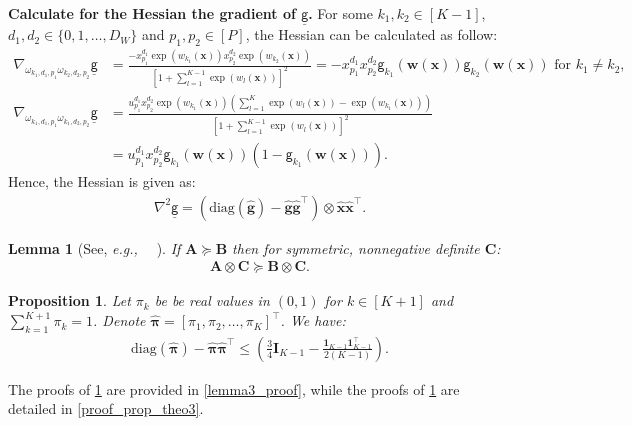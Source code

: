 \documentclass{article}
\def\eg{{\em e.g.,~}}
\newcommand{\nn}{\nonumber} %
\def\pib         {{\sbmm{\pi}}\XS}                 \def\Pib        {{\sbmm{\Pi}}\XS}
\def\XS{\xspace}
\def\sbmm#1{\ensuremath{\boldsymbol{#1}}}
\newtheorem{lemma}{Lemma}
\newtheorem{proposition}{Proposition}
\def\sfg{\mathsf{g}}
\def\evomega{\omega}
\def\vg{{\bm{g}}}
\def\vw{{\bm{w}}}
\def\vx{{\bm{x}}}
\def\evomega{{\omega}}
\def\evu{{u}}
\def\evx{{x}}
\def\mA{{\bm{A}}}
\def\mB{{\bm{B}}}
\def\mC{{\bm{C}}}
\def\mI{{\bm{I}}}
\begin{document}
{\bf Calculate for the Hessian the gradient of $\underline{\sfg}$.} For some $k_1, k_2 \in [K-1]$, $d_1,d_2 \in \{0,1,\dots,D_W\}$ and $p_1, p_2\in [P]$, the Hessian can be calculated as follow:
\begin{align*}
    \nabla_{\evomega_{k_1,d_1,p_1}\evomega_{k_2,d_2,p_2}}\underline{\sfg}&=\frac{-\evx^{d_1}_{p_1}\exp(w_{k_1}(\vx))\evx^{d_2}_{p_2}\exp(w_{k_2}(\vx))}{\left[1+\displaystyle\sum_{l=1}^{K-1}\exp(w_l(\vx))\right]^2}=-\evx^{d_1}_{p_1}\evx^{d_2}_{p_2}\sfg_{k_1}(\vw(\vx))\sfg_{k_2}(\vw(\vx)) \text{ for $k_1 \neq k_2$,}\\
\nabla_{\evomega_{k_1,d_1,p_1}\evomega_{k_1,d_2,p_2}}\underline{\sfg}&=\frac{\evu^{d_1}_{p_1}\evx^{d_2}_{p_2}\exp(w_{k_1}(\vx))\left(\displaystyle\sum_{l=1}^{K}\exp(w_l(\vx))-\exp(w_{k_1}(\vx))\right)}{\left[1+\displaystyle\sum_{l=1}^{K-1}\exp(w_l(\vx))\right]^2}\nn\\
    &=\evu^{d_1}_{p_1}\evx^{d_2}_{p_2}\sfg_{k_1}(\vw(\vx))(1-\sfg_{k_1}(\vw(\vx))).
\end{align*}
Hence, the Hessian is given as:
\begin{align*}
    \nabla^{2}\underline{\sfg}=\left(\text{diag}(\hat{\vg})-\hat{\vg}\hat{\vg}^{\top}\right)\otimes\hat{\vx}\hat{\vx}^{\top}.
\end{align*}
\begin{lemma}[See, \eg~ \cite{bohning1992multinomial}]\label{Kronecker_prod_property}
    If $\mA \succeq \mB$ then for symmetric, nonnegative definite $\mC$:
    \begin{align*}
        \mA \otimes \mC \succeq \mB \otimes \mC.
    \end{align*}
\end{lemma}

\begin{proposition} \label{prop_theo3}
 Let $\pi_k$ be be real values in $(0,1)$ for $k \in [K+1]$ and $\displaystyle\sum_{k=1}^{K+1}\pi_k=1$. 
 Denote $\hat{\pib}=[\pi_1,\pi_2,\dots,\pi_K]^{\top}$. We have:
\begin{align*}
    \text{diag}(\hat{\pib})-\hat{\pib}\hat{\pib}^{\top}\leq \left(\frac{3}{4}\mI_{K-1}-\frac{\bm{1}_{K-1}\bm{1}_{K-1}^{\top}}{2(K-1)}\right).
\end{align*}
\end{proposition}
The proofs of \cref{Kronecker_prod_property} are provided in \cref{lemma3_proof}, while the proofs of \cref{prop_theo3} are detailed in \cref{proof_prop_theo3}.
\end{document}
